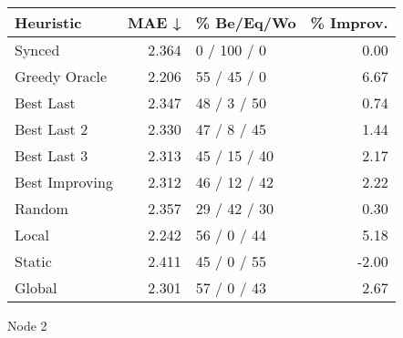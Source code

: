 \begin{tabular}{lrlr}
\toprule
\textbf{Heuristic} & \textbf{MAE ↓} & \textbf{\% Be/Eq/Wo} & \textbf{\% Improv.} \\
\midrule
            Synced &          2.364 &          0 / 100 / 0 &                0.00 \\
     Greedy Oracle &          2.206 &          55 / 45 / 0 &                6.67 \\
         Best Last &          2.347 &          48 / 3 / 50 &                0.74 \\
       Best Last 2 &          2.330 &          47 / 8 / 45 &                1.44 \\
       Best Last 3 &          2.313 &         45 / 15 / 40 &                2.17 \\
    Best Improving &          2.312 &         46 / 12 / 42 &                2.22 \\
            Random &          2.357 &         29 / 42 / 30 &                0.30 \\
             Local &          2.242 &          56 / 0 / 44 &                5.18 \\
            Static &          2.411 &          45 / 0 / 55 &               -2.00 \\
            Global &          2.301 &          57 / 0 / 43 &                2.67 \\
\bottomrule
\end{tabular}
\caption{Node 2}
\label{tab:ds_non_lr05_le2_bs2_2}
